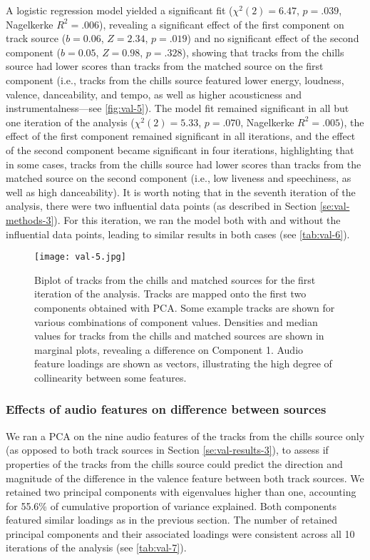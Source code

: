 

A logistic regression model yielded a significant fit ($\chi^2(2) = 6.47$, $p = .039$, Nagelkerke $R^2 = .006$), revealing a significant effect of the first component on track source ($b = 0.06$, $Z = 2.34$, $p = .019$) and no significant effect of the second component ($b = 0.05$, $Z = 0.98$, $p = .328$), showing that tracks from the chills source had lower scores than tracks from the matched source on the first component (i.e., tracks from the chills source featured lower energy, loudness, valence, danceability, and tempo, as well as higher acousticness and instrumentalness---see \autoref{fig:val-5}). The model fit remained significant in all but one iteration of the analysis ($\chi^2(2) = 5.33$, $p = .070$, Nagelkerke $R^2 = .005$), the effect of the first component remained significant in all iterations, and the effect of the second component became significant in four iterations, highlighting that in some cases, tracks from the chills source had lower scores than tracks from the matched source on the second component (i.e., low liveness and speechiness, as well as high danceability). It is worth noting that in the seventh iteration of the analysis, there were two influential data points (as described in Section \ref{se:val-methods-3}). For this iteration, we ran the model both with and without the influential data points, leading to similar results in both cases (see \autoref{tab:val-6}).



\begin{figure}[t!]
\texttt{[image: val-5.jpg]}
\centering
\caption{Biplot of tracks from the chills and matched sources for the first iteration of the analysis. Tracks are mapped onto the first two components obtained with PCA. Some example tracks are shown for various combinations of component values. Densities and median values for tracks from the chills and matched sources are shown in marginal plots, revealing a difference on Component 1. Audio feature loadings are shown as vectors, illustrating the high degree of collinearity between some features.}
\label{fig:val-5}
\end{figure}

\subsubsection{Effects of audio features on difference between sources}

We ran a PCA on the nine audio features of the tracks from the chills source only (as opposed to both track sources in Section \ref{se:val-results-3}), to assess if properties of the tracks from the chills source could predict the direction and magnitude of the difference in the valence feature between both track sources. We retained two principal components with eigenvalues higher than one, accounting for 55.6\% of cumulative proportion of variance explained. Both components featured similar loadings as in the previous section. The number of retained principal components and their associated loadings were consistent across all 10 iterations of the analysis (see \autoref{tab:val-7}).


